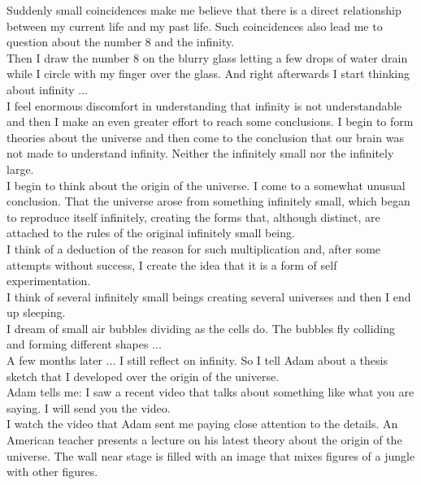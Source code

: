 \documentclass[11pt]{book}
\begin{document}
\noindent Suddenly small coincidences make me believe that there is a direct relationship between my current life and my past life. Such coincidences also lead me to question about the number 8 and the infinity. \\

\noindent Then I draw the number 8 on the blurry glass letting a few drops of water drain while I circle with my finger over the glass. And right afterwards I start thinking about infinity ... \\

\noindent I feel enormous discomfort in understanding that infinity is not understandable and then I make an even greater effort to reach some conclusions. I begin to form theories about the universe and then come to the conclusion that our brain was not made to understand infinity. Neither the infinitely small nor the infinitely large. \\

\noindent I begin to think about the origin of the universe. I come to a somewhat unusual conclusion. That the universe arose from something infinitely small, which began to reproduce itself infinitely, creating the forms that, although distinct, are attached to the rules of the original infinitely small being. \\

\noindent I think of a deduction of the reason for such multiplication and, after some attempts without success, I create the idea that it is a form of self experimentation. \\

\noindent I think of several infinitely small beings creating several universes and then I end up sleeping. \\

\noindent I dream of small air bubbles dividing as the cells do. The bubbles fly colliding and forming different shapes ...  \\

\noindent A few months later ... I still reflect on infinity. So I tell Adam about a thesis sketch that I developed over the origin of the universe. \\

\noindent Adam tells me: I saw a recent video that talks about something like what you are saying. I will send you the video. \\

\noindent I watch the video that Adam sent me paying close attention to the details. An American teacher presents a lecture on his latest theory about the origin of the universe. The wall near stage is filled with an image that mixes figures of a jungle with other figures. \\
\end{document}
